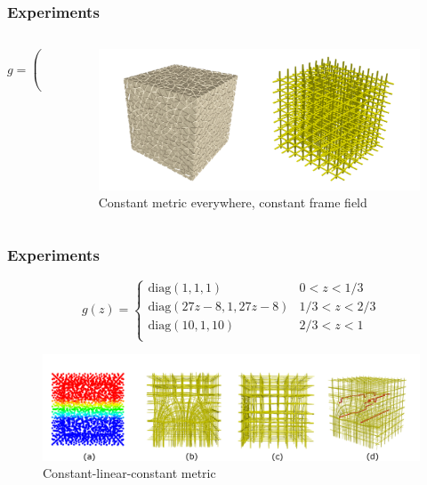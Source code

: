 \documentclass[
	11pt, %
	aspectratio=169, %
]{beamer}
\begin{document}
\begin{frame}
	\frametitle{Experiments}
	\begin{columns}[c] %
	
		\begin{column}{0.25\textwidth} %
			$$g=\begin{pmatrix}
				1 & 0 & 0 \\ 0 & 1 & 0 \\ 0 & 0 & 1
			\end{pmatrix}$$
		\end{column}
		\begin{column}{0.7\textwidth} %
			\begin{figure}
				\includegraphics[width=\linewidth]{image1.png}
				\caption{Constant metric everywhere, constant frame field}
			\end{figure}
		\end{column}
	\end{columns}
\end{frame}
\begin{frame}
	\frametitle{Experiments}	
	\begin{equation}
		g(z) = \begin{cases}
			\mathrm{diag}(1,1,1) &0 < z < 1/3 \\
			\mathrm{diag}(27z-8,1,27z-8) &1/3 < z < 2/3 \\
			\mathrm{diag}(10,1,10) &2/3 < z < 1 \\
	\end{cases}\end{equation}\label{eq:metric}
	\begin{figure}
		\includegraphics[width=0.9\linewidth]{image2.png}
		\caption{Constant-linear-constant metric}
	\end{figure}
\end{frame}
\frame
\end{document}
